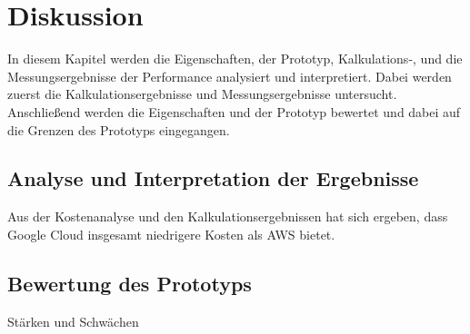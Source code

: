 \chapter{Diskussion}

In diesem Kapitel werden die Eigenschaften, der Prototyp, Kalkulations-, und die Messungsergebnisse der Performance analysiert und interpretiert. Dabei werden zuerst die Kalkulationsergebnisse und Messungsergebnisse untersucht. Anschließend werden die Eigenschaften und der Prototyp bewertet und dabei auf die Grenzen des Prototyps eingegangen.
  
\section{Analyse und Interpretation der Ergebnisse}

Aus der Kostenanalyse und den Kalkulationsergebnissen hat sich ergeben, dass Google Cloud insgesamt niedrigere Kosten als AWS bietet. 

\section{Bewertung des Prototyps}

Stärken und Schwächen